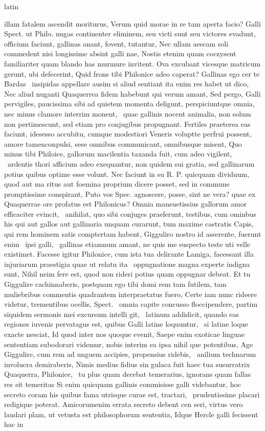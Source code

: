 \documentclass[12pt]{book}
\renewenvironment{latin}
    	{\begin{hyphenrules}{latin}}
    	{\end{hyphenrules}}
\begin{document}
\begin{pages}
\begin{latin}
\begin{Leftside}
illam fatalem ascendit moriturus, Verum quid morae in re tam aperta facio? Galli Spect. ut Philo. nugas continenter eliminem, seu victi sunt seu victores evadunt, officium faciunt, gallinas anant, fovent, tutantur, Nec ullam aescam soli commedent nisi longissime absint galli nae, Nostis etenim quam coczysent familiariter quam blando has murmure invitent. Ova excubant vicesque matricum gerunt, ubi defecerint, Quid frons tibi Philonice adeo caperat? Gallinas ego cer te Bardas ﻿\ampersand\ insipidas appellare ausim si aliud sentiant ita enim res habet ut dico, Nec aliud nuganti Quaquerrea fidem habebunt qui verum amant, Sed pergo, Galli pervigiles, paucissima sibi ad quietem   momenta deligunt, perspiciuntque omnia, nec minus clamore interrim monent, ﻿\ampersand\ quae gallinis nocent animalia, non solum non pertimescunt, sed etiam pro conjugibus propugnant. Fertiles praeterea eas faciunt, idesesso accubitu, cumque modestiori Veneris voluptte perfrui possent, amore tamenconpulsi, sese omnibus communicant, omnibusque misent, Quo minus tibi Philoice, gallorum macilentia taxanda fuit, cum adeo vigilent, ﻿\ampersand\ ardentis thori afficium adeo exequantur, non quidem sui gratia, sed gallinarum potius quibus optime esse volunt. Nec faciunt in su R. P. quicquam dividuum, quod aut ma ritus aut foemina proprium dicere posset, sed in commune promptissime conspirant, Puto vos Spec. agnoscere, posse, sint ne vera? quae ex Quaquerrae ore profatus est Philonicus? Omnia mansuetissius gallorum amor efficaciter evincit, ﻿\ampersand\ anihilat, quo sibi conjuges praeferunt, testibus, cum ominbus his qui aut gallos aut gallinaria unquam curarunt, tum maxime castratis Capis, qui rem hominem satis comptertam habent, Gigguliro nostro id asserente, fuerunt enim ﻿\ampersand\ ipsi galli, ﻿\ampersand\ gallinas etiamnum amant, ne quis me suspecto teste uti velle existimet. Facesse igitur Philonice, cum ista tua delirante Lamiga, facessant illa injuriarum praestigia quae ut relatu ita ﻿\ampersand\ oppugnatione magna experte indigna sunt, Nihil neim fere est, quod non rideri potius quam oppugnar debeat. Et tu Giggulire cachinnaberis, postquam ego tibi domi rem tam futilem, tam muliebribus commentis quadrantem interpraetatus fuero, Certe iam nunc rideere videtur, trementibus ocellis, Spect. ﻿\ampersand\ omnia capite concusso floccipendere, partim siquidem sermonis mei excursum intelli git, ﻿\ampersand\ latinum addidicit, quando eas regiones iuvenis pervatagus est, quibus Galli latine loquuntur, ﻿\ampersand\ si latine loque exacte nesciat, Id quod inter nos quoque evenit, Saepe enim exoticae linguae sententiam subodorari videmur, nobis interim ea ipsa nihil que potentibus, Age Giggulire, cum rem ad unguem accipies, propensius ridebis, ﻿\ampersand\   anilium technarum involucra demiraberis, Nimis medius fidius sin gulaca fuit haec tua susurratrix Quaquerra, Philonice, ﻿\ampersand\ tu plus quam decebat temerarius, ignorans quam fallas res sit temeritas Si enim quicquam gallinis commisisse galli videbantur, hoc secreto coram his quibus fama utrisque curae est, tractari, ﻿\ampersand\ prudentissime placari redigique poterat. Amicorumenim errata secreto debent cen seri, virtus vero laudari plam, ut vetusta est philosophorum sententia, Idque Hercle galli fecissent hac in 
\end{Leftside}
\end{latin}
\end{pages}
\end{document}
